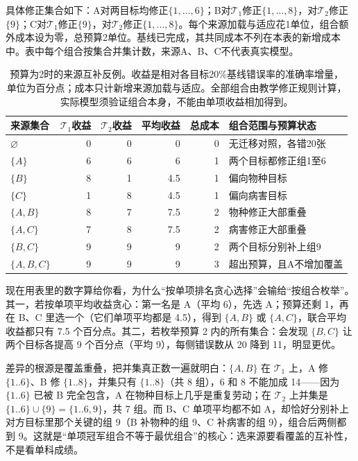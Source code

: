 具体修正集合如下：A对两目标均修正$\{1,\ldots,6\}$；B对$\mathcal T_1$修正$\{1,\ldots,8\}$，对$\mathcal T_2$修正$\{9\}$；C对$\mathcal T_1$修正$\{9\}$，对$\mathcal T_2$修正$\{1,\ldots,8\}$。每个来源加载与适应花1单位，组合额外成本设为零，总预算2单位。基线已完成，其共同成本不列在本表的新增成本中。表中每个组合按集合并集计数，来源A、B、C不代表真实模型。

\begin{table}[htbp]
  \centering
  \small
  \begin{tabularx}{\linewidth}{lrrrrX}
    \toprule
    来源集合 & $\mathcal T_1$收益 & $\mathcal T_2$收益 & 平均收益 & 总成本 & 组合范围与预算状态 \\
    \midrule
    $\varnothing$ & 0 & 0 & 0 & 0 & 无迁移对照，各错20张 \\
    $\{A\}$ & 6 & 6 & 6 & 1 & 两个目标都修正组1至6 \\
    $\{B\}$ & 8 & 1 & 4.5 & 1 & 偏向物种目标 \\
    $\{C\}$ & 1 & 8 & 4.5 & 1 & 偏向病害目标 \\
    $\{A,B\}$ & 8 & 7 & 7.5 & 2 & 物种修正大部重叠 \\
    $\{A,C\}$ & 7 & 8 & 7.5 & 2 & 病害修正大部重叠 \\
    $\{B,C\}$ & 9 & 9 & 9 & 2 & 两个目标分别补上组9 \\
    $\{A,B,C\}$ & 9 & 9 & 9 & 3 & 超出预算，且A不增加覆盖 \\
    \bottomrule
  \end{tabularx}
  \caption{预算为2时的来源互补反例。收益是相对各目标20\%基线错误率的准确率增量，单位为百分点；成本只计新增来源加载与适应。全部组合由教学修正规则计算，实际模型须验证组合本身，不能由单项收益相加得到。}
  \label{tab:ket-reuse-complementarity}
\end{table}

现在用表里的数字算给你看，为什么“按单项排名贪心选择”会输给“按组合枚举”。其一，若按单项平均收益贪心：第一名是 A（平均 6），先选 A；预算还剩 1，再在 B、C 里选一个（它们单项平均都是 4.5），得到 $\{A,B\}$ 或 $\{A,C\}$，联合平均收益都只有 7.5 个百分点。其二，若枚举预算 2 内的所有集合：会发现 $\{B,C\}$ 让两个目标各提高 9 个百分点（平均 9），每侧错误数从 20 降到 11，明显更优。

差异的根源是覆盖重叠，把并集真正数一遍就明白：$\{A,B\}$ 在 $\mathcal T_1$ 上，A 修 $\{1..6\}$、B 修 $\{1..8\}$，并集只有 $\{1..8\}$（共 8 组），6 和 8 不能加成 14——因为 $\{1..6\}$ 已被 B 完全包含，A 在物种目标上几乎是重复劳动；在 $\mathcal T_2$ 上并集是 $\{1..6\}\cup\{9\}=\{1..6,9\}$，共 7 组。而 B、C 单项平均都不如 A，却恰好分别补上对方目标里那个关键的组 9（B 补物种的组 9、C 补病害的组 9），组合后两侧都到 9。这就是“单项冠军组合不等于最优组合”的核心：选来源要看覆盖的互补性，不是看单科成绩。

